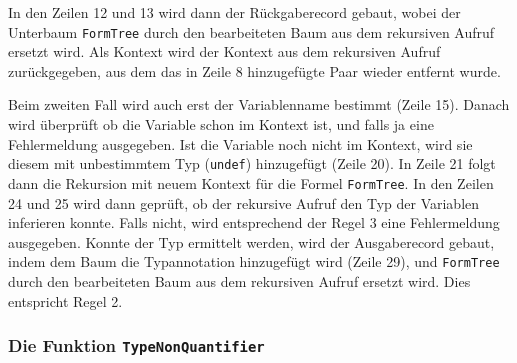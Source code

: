 In den Zeilen 12 und 13 wird dann der R\"uckgaberecord gebaut, wobei
der Unterbaum {\tt FormTree} durch den bearbeiteten Baum aus dem
rekursiven Aufruf ersetzt wird. Als Kontext wird der Kontext aus dem
rekursiven Aufruf zur\"uckgegeben, aus dem das in Zeile 8
hinzugef\"ugte Paar wieder entfernt wurde.

Beim zweiten Fall wird auch erst der Variablenname bestimmt (Zeile
15). Danach wird \"uberpr\"uft ob die Variable schon im Kontext ist,
und falls ja eine Fehlermeldung ausgegeben. Ist die Variable noch
nicht im Kontext, wird sie diesem mit unbestimmtem Typ ({\tt undef})
hinzugef\"ugt (Zeile 20). In Zeile 21 folgt dann die Rekursion mit
neuem Kontext f\"ur die Formel {\tt FormTree}. In den Zeilen 24 und 25
wird dann gepr\"uft, ob der rekursive Aufruf den Typ der Variablen
inferieren konnte. Falls nicht, wird entsprechend der Regel 3 eine
Fehlermeldung ausgegeben. Konnte der Typ ermittelt werden, wird der
Ausgaberecord gebaut, indem dem Baum die Typannotation hinzugef\"ugt
wird (Zeile 29), und {\tt FormTree} durch den bearbeiteten Baum aus
dem rekursiven Aufruf ersetzt wird. Dies entspricht Regel 2.

\subsubsection{Die Funktion {\tt TypeNonQuantifier}}



